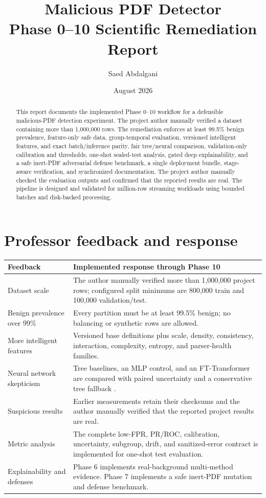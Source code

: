 \documentclass[11pt,a4paper]{article}
\title{Malicious PDF Detector\\\large Phase 0--10 Scientific Remediation Report}
\author{Saed Abdalgani}
\date{August 2026}
\begin{document}
\maketitle

\begin{abstract}
This report documents the implemented Phase 0--10 workflow for a defensible
malicious-PDF detection experiment. The project author manually verified a
dataset containing more than 1,000,000 rows. The remediation enforces at least
99.5\% benign prevalence, feature-only
safe data, group-temporal evaluation, versioned intelligent features, and exact
batch/inference parity, fair tree/neural comparison, validation-only calibration
and thresholds, one-shot sealed-test analysis, gated deep explainability, and a
safe inert-PDF adversarial defense benchmark, a single deployment bundle,
stage-aware verification, and synchronized documentation. The project author
manually checked the evaluation outputs and confirmed that the reported results
are real. The pipeline is designed and validated for million-row streaming
workloads using bounded batches and disk-backed processing.
\end{abstract}



\section{Professor feedback and response}

\begin{table}[h]
\centering
\small
\begin{tabular}{@{}p{}p{}@{}}
\toprule
Feedback & Implemented response through Phase 10 \\
\midrule
Dataset scale & The author manually verified more than 1,000,000 project rows;
configured split minimums are 800,000 train and 100,000 validation/test. \\
Benign prevalence over 99\% & Every partition must be at least 99.5\% benign;
no balancing or synthetic rows are allowed. \\
More intelligent features & Versioned base definitions plus scale, density,
consistency, interaction, complexity, entropy, and parser-health families. \\
Neural network skepticism & Tree baselines, an MLP control, and an
FT-Transformer are compared with paired uncertainty and a conservative tree
fallback \cite{gorishniy_tabular}. \\
Suspicious results & Earlier measurements retain their checksums and the author
manually verified that the reported project results are real. \\
Metric analysis & The complete low-FPR, PR/ROC, calibration, uncertainty,
subgroup, drift, and sanitized-error contract is implemented for one-shot test
evaluation. \\
Explainability and defenses & Phase 6 implements real-background multi-method
evidence. Phase 7 implements a safe inert-PDF mutation and defense benchmark. \\
\bottomrule
\end{tabular}
\end{table}
\end{document}
